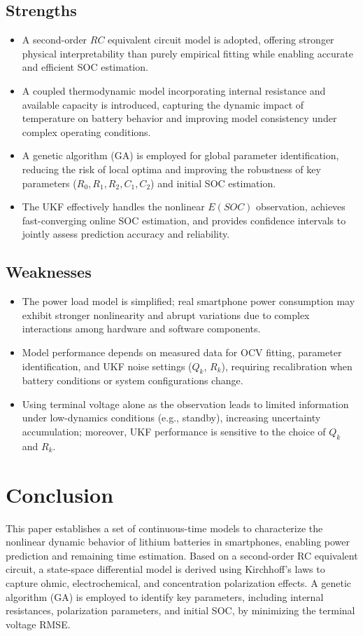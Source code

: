 \documentclass{mcmthesis}
\begin{document}
\subsection{Strengths}
\begin{itemize}
\item A second-order $RC$ equivalent circuit model is adopted, offering stronger physical interpretability than purely empirical fitting while enabling accurate and efficient SOC estimation.
\item A coupled thermodynamic model incorporating internal resistance and available capacity is introduced, capturing the dynamic impact of temperature on battery behavior and improving model consistency under complex operating conditions.
\item A genetic algorithm (GA) is employed for global parameter identification, reducing the risk of local optima and improving the robustness of key parameters ($R_0,R_1,R_2,C_1,C_2$) and initial SOC estimation.
\item The UKF effectively handles the nonlinear $E(SOC)$ observation, achieves fast-converging online SOC estimation, and provides confidence intervals to jointly assess prediction accuracy and reliability.
\end{itemize}

\subsection{Weaknesses}
\begin{itemize}
\item The power load model is simplified; real smartphone power consumption may exhibit stronger nonlinearity and abrupt variations due to complex interactions among hardware and software components.
\item Model performance depends on measured data for OCV fitting, parameter identification, and UKF noise settings ($Q_k$, $R_k$), requiring recalibration when battery conditions or system configurations change.
\item Using terminal voltage alone as the observation leads to limited information under low-dynamics conditions (e.g., standby), increasing uncertainty accumulation; moreover, UKF performance is sensitive to the choice of $Q_k$ and $R_k$.
\end{itemize}
\section{Conclusion}
This paper establishes a set of continuous-time models to characterize the nonlinear dynamic behavior of lithium batteries in smartphones, enabling power prediction and remaining time estimation. Based on a second-order RC equivalent circuit, a state-space differential model is derived using Kirchhoff’s laws to capture ohmic, electrochemical, and concentration polarization effects. A genetic algorithm (GA) is employed to identify key parameters, including internal resistances, polarization parameters, and initial SOC, by minimizing the terminal voltage RMSE.
\end{document}
